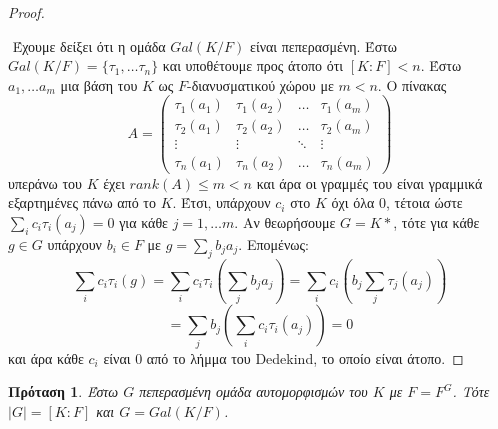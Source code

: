 \documentclass[oneside,a4paper]{article}
\newtheorem{prop}{Πρόταση}
\newcommand {\tl}{\textlatin}
\begin{document}
\begin{proof} $ $

	$ $\newline
	Έχουμε δείξει ότι η ομάδα $Gal(K/F)$ είναι πεπερασμένη. Έστω $Gal(K/F) = \{\tau_1 , \ldots \tau_n \}$ και υποθέτουμε προς άτοπο ότι $[K:F] < n$. Έστω $a_1 ,\ldots a_m$ μια βάση του $K$ ως $F$-διανυσματικού χώρου με $m<n$. Ο πίνακας
	\[A = 
	\begin{pmatrix}
		\tau_1 (a_1) & \tau_1 (a_2) & \ldots  & \tau_1 (a_m) \\
		\tau_2 (a_1) & \tau_2 (a_2) & \ldots & \tau_2 (a_m) \\
		\vdots & \vdots & \ddots & \vdots \\
		\tau_n (a_1) & \tau_n (a_2) & \ldots & \tau_n (a_m)
	\end{pmatrix}
	\]
	υπεράνω του $K$ έχει $rank(A) \leq m < n$ και άρα οι γραμμές του είναι γραμμικά εξαρτημένες πάνω από το $K$. Έτσι, υπάρχουν $c_i$ στο $K$ όχι όλα $0$, τέτοια ώστε $\sum\limits_i c_i \tau_i (a_j) = 0$ για κάθε $j = 1,\ldots m$. Αν θεωρήσουμε $G = K*$, τότε για κάθε $g \in G$ υπάρχουν $b_i \in F$ με $g = \sum\limits_j b_j a_j$.
	Επομένως:
	$$\sum\limits_i c_i \tau_i (g) = \sum\limits_i c_i \tau_i \left(\sum\limits_j b_j a_j\right) = \sum\limits_i c_i \left( b_j \sum\limits_j \tau_j (a_j)\right)$$
	$$ = \sum\limits_j b_j \left( \sum\limits_i c_i \tau_i (a_j) \right) = 0$$
	και άρα κάθε $c_i$ είναι $0$ από το λήμμα του \tl{Dedekind}, το οποίο είναι άτοπο.
\end{proof}

\begin{prop}
	\label{duo dekatessera}
	Έστω $G$ πεπερασμένη ομάδα αυτομορφισμών του $K$ με $F=F^G$. Τότε $|G| = [K:F]$ και $G = Gal(K/F)$.
\end{prop}
\end{document}
